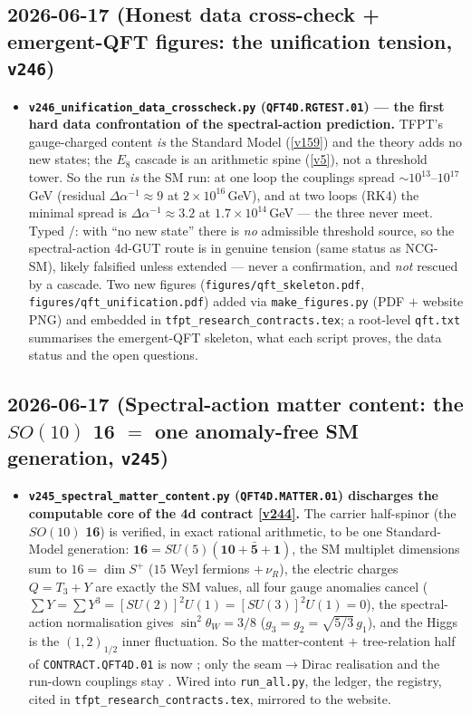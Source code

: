 \subsection*{2026-06-17 (Honest data cross-check + emergent-QFT figures: the unification tension, \texttt{v246})}
\begin{itemize}
\item \textbf{\texttt{v246\_unification\_data\_crosscheck.py} (\texttt{QFT4D.RGTEST.01}) --- the first hard
  data confrontation of the spectral-action prediction.} TFPT's gauge-charged content \emph{is} the
  Standard Model (\vref{v159}) and the theory adds no new states; the $E_8$ cascade is an arithmetic spine
  (\vref{v5}), not a threshold tower. So the run \emph{is} the SM run: at one loop the couplings spread
  ${\sim}10^{13}$--$10^{17}$\,GeV (residual $\Delta\alpha^{-1}\approx9$ at $2{\times}10^{16}$\,GeV), and at
  two loops (RK4) the minimal spread is $\Delta\alpha^{-1}\approx3.2$ at $1.7{\times}10^{14}$\,GeV --- the
  three never meet. Typed \mX/\mO: with ``no new state'' there is \emph{no} admissible threshold source, so
  the spectral-action 4d-GUT route is in genuine tension (same status as NCG-SM), likely falsified unless
  extended --- never a confirmation, and \emph{not} rescued by a cascade. Two new figures
  (\texttt{figures/qft\_skeleton.pdf},
  \texttt{figures/qft\_unification.pdf}) added via \texttt{make\_figures.py} (PDF $+$ website PNG) and
  embedded in \texttt{tfpt\_research\_contracts.tex}; a root-level \texttt{qft.txt} summarises the
  emergent-QFT skeleton, what each script proves, the data status and the open questions.
\end{itemize}

\subsection*{2026-06-17 (Spectral-action matter content: the $SO(10)$ \textbf{16} $=$ one anomaly-free SM generation, \texttt{v245})}
\begin{itemize}
\item \textbf{\texttt{v245\_spectral\_matter\_content.py} (\texttt{QFT4D.MATTER.01})
  discharges the computable core of the 4d contract \vref{v244}.} The carrier
  half-spinor (the $SO(10)$ \textbf{16}) is verified, in exact rational arithmetic,
  to be one Standard-Model generation: $\mathbf{16}=SU(5)(\mathbf{10}{+}\bar{\mathbf
  5}{+}\mathbf1)$, the SM multiplet dimensions sum to $16=\dim S^+$ ($15$ Weyl
  fermions $+\,\nu_R$), the electric charges $Q=T_3+Y$ are exactly the SM values,
  all four gauge anomalies cancel ($\sum Y=\sum Y^3=[SU(2)]^2U(1)=[SU(3)]^2U(1)=0$),
  the spectral-action normalisation gives $\sin^2\theta_W=3/8$
  ($g_3=g_2=\sqrt{5/3}\,g_1$), and the Higgs is the $(1,2)_{1/2}$ inner fluctuation.
  So the matter-content $+$ tree-relation half of \texttt{CONTRACT.QFT4D.01} is now
  \mE; only the seam$\to$Dirac realisation and the run-down couplings stay \mO.
  Wired into \texttt{run\_all.py}, the ledger, the registry, cited in
  \texttt{tfpt\_research\_contracts.tex}, mirrored to the website.
\end{itemize}

